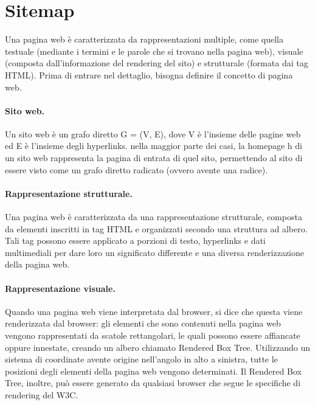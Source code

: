 \documentclass[10pt]{article}
\begin{document}
\section{Sitemap}
Una pagina web è caratterizzata da rappresentazioni multiple, come quella testuale (mediante i termini e le parole che si trovano nella pagina web), visuale (composta dall'informazione del rendering del sito) e strutturale (formata dai tag HTML). Prima di entrare nel dettaglio, bisogna definire il concetto di pagina web.

\paragraph{Sito web.} Un sito web è un grafo diretto G = (V, E), dove V è l'insieme delle pagine web ed E è l'insieme degli hyperlinks. nella maggior parte dei casi, la homepage h di un sito web rappresenta la pagina di entrata di quel sito, permettendo al sito di essere visto come un grafo diretto radicato (ovvero avente una radice).

\paragraph{Rappresentazione strutturale.} Una pagina web è caratterizzata da una rappresentazione strutturale, composta da elementi inscritti in tag HTML e organizzati secondo una struttura ad albero. Tali tag possono essere applicato a porzioni di testo, hyperlinks e dati multimediali per dare loro un significato differente e una diversa renderizzazione della pagina web.

\paragraph{Rappresentazione visuale.} Quando una pagina web viene interpretata dal browser, si dice che questa viene renderizzata dal browser: gli elementi che sono contenuti nella pagina web vengono rappresentati da scatole rettangolari, le quali possono essere affiancate oppure innestate, creando un albero chiamato Rendered Box Tree. Utilizzando un sistema di coordinate avente origine nell'angolo in alto a sinistra, tutte le posizioni degli elementi della pagina web vengono determinati. Il Rendered Box Tree, inoltre, può essere generato da qualsiasi browser che segue le specifiche di rendering del W3C.
\end{document}
